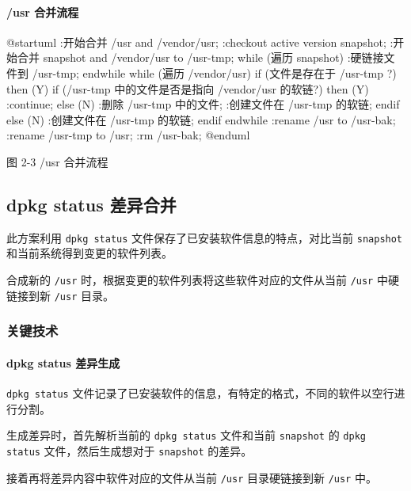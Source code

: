 \documentclass{utart}
\begin{document}
\paragraph{/usr 合并流程}
\begin{center}
  \begin{adjustbox}{scale=0.85}
    \begin{plantuml}
      @startuml
      :开始合并 /usr and /vendor/usr;
      :checkout active version snapshot;
      :开始合并 snapshot and /vendor/usr to /usr-tmp;
      while (遍历 snapshot)
      :硬链接文件到 /usr-tmp;
      endwhile
      while (遍历 /vendor/usr)
      if (文件是存在于 /usr-tmp ?) then (Y)
      if (/usr-tmp 中的文件是否是指向 /vendor/usr 的软链?) then (Y)
      :continue;
      else (N)
      :删除 /usr-tmp 中的文件;
      :创建文件在 /usr-tmp 的软链;
      endif
      else (N)
      :创建文件在 /usr-tmp 的软链;
      endif
      endwhile
      :rename /usr to /usr-bak;
      :rename /usr-tmp to /usr;
      :rm /usr-bak;
      @enduml
    \end{plantuml}
  \end{adjustbox}

  图 2-3 /usr 合并流程
\end{center}

\subsection{dpkg status 差异合并}
此方案利用 \texttt{dpkg status} 文件保存了已安装软件信息的特点，对比当前 \texttt{snapshot} 和当前系统得到变更的软件列表。

合成新的 \texttt{/usr} 时，根据变更的软件列表将这些软件对应的文件从当前 \texttt{/usr} 中硬链接到新 \texttt{/usr} 目录。

\subsubsection{关键技术}
\paragraph{dpkg status 差异生成}
\texttt{dpkg status} 文件记录了已安装软件的信息，有特定的格式，不同的软件以空行进行分割。

生成差异时，首先解析当前的 \texttt{dpkg status} 文件和当前 \texttt{snapshot} 的 \texttt{dpkg status} 文件，然后生成想对于 \texttt{snapshot} 的差异。

接着再将差异内容中软件对应的文件从当前 \texttt{/usr} 目录硬链接到新 \texttt{/usr} 中。
\end{document}
